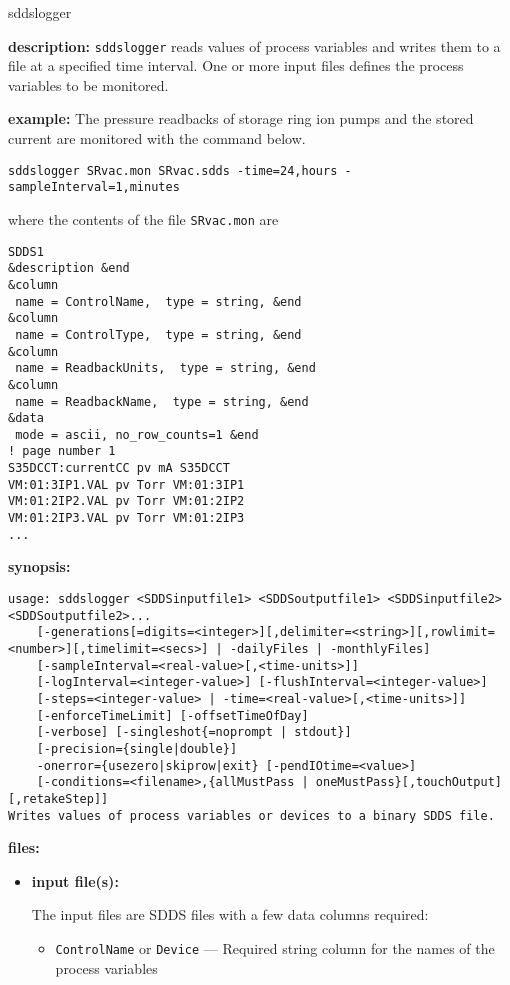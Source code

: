 \begin{sddsprog}{sddslogger}
\item {\bf description:}
\verb+sddslogger+ reads values of process variables and writes them to a file at a specified time interval.
One or more input files defines the process variables to be monitored.
\item {\bf example:} 
% 
The pressure readbacks of storage ring ion pumps and the stored current are monitored
with the command below.
\begin{verbatim}
sddslogger SRvac.mon SRvac.sdds -time=24,hours -sampleInterval=1,minutes
\end{verbatim}
where the contents of the file \verb+SRvac.mon+ are
\begin{verbatim}
SDDS1
&description &end
&column
 name = ControlName,  type = string, &end
&column
 name = ControlType,  type = string, &end
&column
 name = ReadbackUnits,  type = string, &end
&column
 name = ReadbackName,  type = string, &end
&data
 mode = ascii, no_row_counts=1 &end
! page number 1
S35DCCT:currentCC pv mA S35DCCT
VM:01:3IP1.VAL pv Torr VM:01:3IP1
VM:01:2IP2.VAL pv Torr VM:01:2IP2 
VM:01:2IP3.VAL pv Torr VM:01:2IP3 
...
\end{verbatim}
\item {\bf synopsis:} 
\begin{verbatim}
usage: sddslogger <SDDSinputfile1> <SDDSoutputfile1> <SDDSinputfile2> <SDDSoutputfile2>...
    [-generations[=digits=<integer>][,delimiter=<string>][,rowlimit=<number>][,timelimit=<secs>] | -dailyFiles | -monthlyFiles]
    [-sampleInterval=<real-value>[,<time-units>]]
    [-logInterval=<integer-value>] [-flushInterval=<integer-value>]
    [-steps=<integer-value> | -time=<real-value>[,<time-units>]]
    [-enforceTimeLimit] [-offsetTimeOfDay]
    [-verbose] [-singleshot{=noprompt | stdout}]
    [-precision={single|double}]
    -onerror={usezero|skiprow|exit} [-pendIOtime=<value>]
    [-conditions=<filename>,{allMustPass | oneMustPass}[,touchOutput][,retakeStep]]
Writes values of process variables or devices to a binary SDDS file.
\end{verbatim}
\item {\bf files:}
\begin{itemize}
\item {\bf input file(s):}\par
The input files are SDDS files with a few data columns required:
\begin{itemize}
        \item {\tt ControlName} or {\tt Device} --- Required string column for the names of the process variables

\end{itemize}
\end{itemize}
\end{sddsprog}
